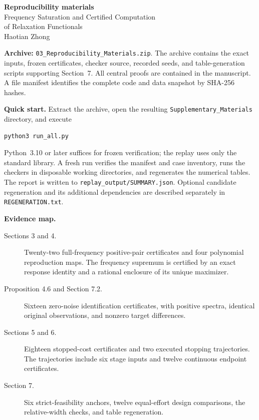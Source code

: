 \documentclass[11pt]{article}
\begin{document}
\begin{center}
{\Large\bfseries Reproducibility materials}\\[0.6em]
{\large Frequency Saturation and Certified Computation\\of Relaxation Functionals}\\[0.4em]
Haotian Zhong
\end{center}

\textbf{Archive:} \texttt{03\_Reproducibility\_Materials.zip}.
The archive contains the exact inputs, frozen certificates, checker source,
recorded seeds, and table-generation scripts supporting Section~7. All central
proofs are contained in the manuscript. A file manifest identifies the complete
code and data snapshot by SHA-256 hashes.

\textbf{Quick start.} Extract the archive, open the resulting
\texttt{Supplementary\_Materials} directory, and execute
\begin{verbatim}
python3 run_all.py
\end{verbatim}
Python~3.10 or later suffices for frozen verification; the replay uses only the
standard library. A fresh run verifies the manifest and case inventory, runs the
checkers in disposable working directories, and regenerates the numerical tables.
The report is written to \texttt{replay\_output/SUMMARY.json}. Optional candidate
regeneration and its additional dependencies are described separately in
\texttt{REGENERATION.txt}.

\textbf{Evidence map.}
\begin{description}
\item[Sections 3 and 4.] Twenty-two full-frequency positive-pair certificates and
four polynomial reproduction maps. The frequency supremum is certified by an
exact response identity and a rational enclosure of its unique maximizer.
\item[Proposition 4.6 and Section 7.2.] Sixteen zero-noise identification
certificates, with positive spectra, identical original observations, and
nonzero target differences.
\item[Sections 5 and 6.] Eighteen stopped-cost certificates and two executed
stopping trajectories. The trajectories include six stage inputs and twelve
continuous endpoint certificates.
\item[Section 7.] Six strict-feasibility anchors, twelve equal-effort design
comparisons, the relative-width checks, and table regeneration.
\end{description}
\end{document}
